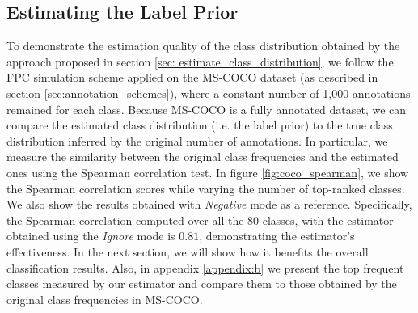 \subsection{Estimating the Label Prior}
\label{sec:results_estimate_class_prior}
To demonstrate the estimation quality of the class distribution obtained by the approach proposed in section \ref{sec: estimate_class_distribution}, we follow the FPC simulation scheme applied on the MS-COCO dataset (as described in section \ref{sec:annotation_schemes}), where a constant number of 1,000 annotations remained for each class. Because MS-COCO is a fully annotated dataset, we can compare the estimated class distribution (i.e. the label prior) to the true class distribution inferred by the original number of annotations. In particular, we measure the similarity between the original class frequencies and the estimated ones using the Spearman correlation test. In figure \ref{fig:coco_spearman}, we show the Spearman correlation scores while varying the number of top-ranked classes. We also show the results obtained with \textit{Negative} mode as a reference. Specifically, the Spearman correlation computed over all the 80 classes, with the estimator obtained using the \textit{Ignore} mode is $0.81$, demonstrating the estimator's effectiveness. In the next section, we will show how it benefits the overall classification results. Also, in appendix \ref{appendix:b} we present the top frequent classes measured by our estimator and compare them to those obtained by the original class frequencies in MS-COCO.







































